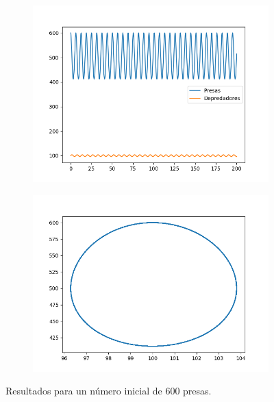 \documentclass[11pt,a4paper]{article}
\begin{document}
\begin{figure}[H]
\centering
\begin{subfigure}{.5\textwidth}
	\centering
	\includegraphics[scale=0.45]{img/x600y100}
	\label{fig:x600}
\end{subfigure}%
\begin{subfigure}{.5\textwidth}
	\centering
	\includegraphics[scale=0.45]{img/circulo-x600}
	\label{fig:circ-x600}
\end{subfigure}
\caption{Resultados para un número inicial de 600 presas.}
\end{figure}
\end{document}
